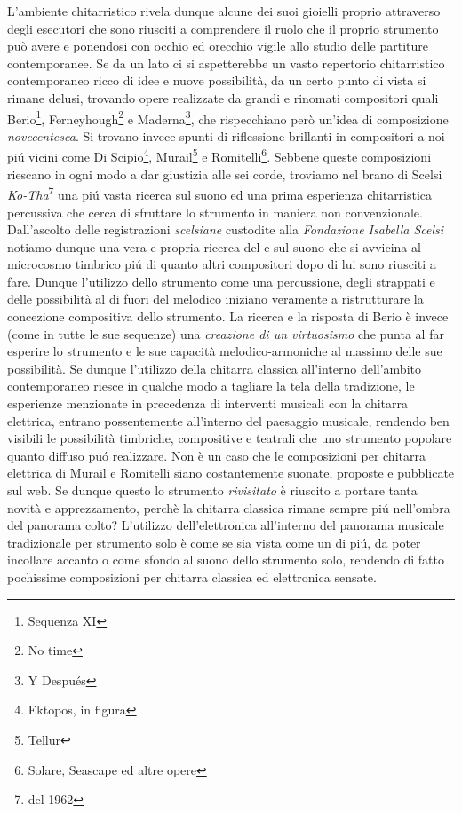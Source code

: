 \documentclass[oneside]{article}
\begin{document}
\begin{multicols*}{2}
L'ambiente chitarristico rivela dunque alcune dei suoi gioielli proprio attraverso degli esecutori che sono riusciti a comprendere il ruolo che il proprio strumento può avere e ponendosi con occhio ed orecchio vigile allo studio delle partiture contemporanee. Se da un lato ci si aspetterebbe un vasto repertorio chitarristico contemporaneo ricco di idee e nuove possibilità, da un certo punto di vista si rimane delusi, trovando opere realizzate da grandi e rinomati compositori quali Berio\footnote{Sequenza XI}, Ferneyhough\footnote{No time} e Maderna\footnote{Y Después}, che rispecchiano però un'idea di composizione \textit{novecentesca}. Si trovano invece spunti di riflessione brillanti in compositori a noi piú vicini come Di Scipio\footnote{Ektopos, in figura}, Murail\footnote{Tellur} e Romitelli\footnote{Solare, Seascape ed altre opere}. Sebbene queste composizioni riescano in ogni modo a dar giustizia alle sei corde, troviamo nel brano di Scelsi \textit{Ko-Tha}\footnote{del 1962} una piú vasta ricerca sul suono ed una prima esperienza chitarristica percussiva che cerca di sfruttare lo strumento in maniera non convenzionale. Dall'ascolto delle registrazioni \textit{scelsiane} custodite alla \textit{Fondazione Isabella Scelsi} notiamo dunque una vera e propria ricerca del e sul suono che si avvicina al microcosmo timbrico piú di quanto altri compositori dopo di lui sono riusciti a fare. Dunque l'utilizzo dello strumento come una percussione, degli strappati e delle possibilità al di fuori del melodico iniziano veramente a ristrutturare la concezione compositiva dello strumento. La ricerca e la risposta di Berio è invece (come in tutte le sue sequenze) una \textit{creazione di un virtuosismo} che punta al far esperire lo strumento e le sue capacità melodico-armoniche al massimo delle sue possibilità. 
Se dunque l'utilizzo della chitarra classica all'interno dell'ambito contemporaneo riesce in qualche modo a tagliare la tela della tradizione, le esperienze menzionate in precedenza di interventi musicali con la chitarra elettrica, entrano possentemente all'interno del paesaggio musicale, rendendo ben visibili le possibilità timbriche, compositive e teatrali che uno strumento popolare quanto diffuso puó realizzare. Non è un caso che le composizioni per chitarra elettrica di Murail e Romitelli siano costantemente suonate, proposte e pubblicate sul web. 
Se dunque questo lo strumento \textit{rivisitato} è riuscito a portare tanta novità e apprezzamento, perchè la chitarra classica rimane sempre piú nell'ombra del panorama colto?
L'utilizzo dell'elettronica all'interno del panorama musicale tradizionale per strumento solo è come se sia vista come un di piú, da poter incollare accanto o come sfondo al suono dello strumento solo, rendendo di fatto pochissime composizioni per chitarra classica ed elettronica sensate.


\end{multicols*}
\end{document}

